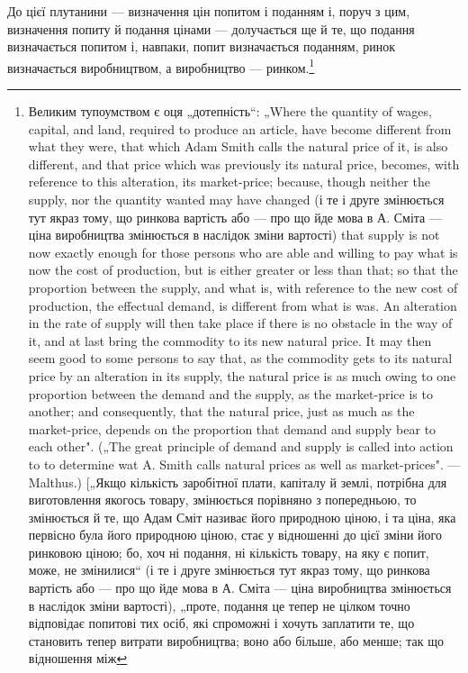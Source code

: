 До цієї плутанини — визначення цін попитом і поданням і,
поруч з цим, визначення попиту й подання цінами — долучається
ще й те, що подання визначається попитом і, навпаки,
попит визначається поданням, ринок визначається виробництвом,
а виробництво — ринком.\footnote{
Великим тупоумством є оця „дотепність“: „Where the quantity of wages,
capital, and land, required to produce an article, have become different from what
they were, that which Adam Smith calls the natural price of it, is also different,
and that price which was previously its natural price, becomes, with reference to
this alteration, its market-price; because, though neither the supply, nor the quantity
wanted may have changed (і те і друге змінюється тут якраз тому, що
ринкова вартість або — про що йде мова в А. Сміта — ціна виробництва змінюється
в наслідок зміни вартості) that supply is not now exactly enough for
those persons who are able and willing to pay what is now the cost of production,
but is either greater or less than that; so that the proportion between the supply,
and what is, with reference to the new cost of production, the effectual demand,
is different from what is was. An alteration in the rate of supply will then take
place if there is no obstacle іn the way of it, and at last bring the commodity
to its new natural price. It may then seem good to some persons to say that, as
the commodity gets to its natural price by an alteration in its supply, the natural
price is as much owing to one proportion between the demand and the supply, as
the market-price is to another; and consequently, that the natural price, just as
much as the market-price, depends on the proportion that demand and supply
bear to each other". („The great principle of demand and supply is called into
action to to determine wat A. Smith calls natural prices as well as market-prices". —
Malthus.) [„Якщо кількість заробітної плати, капіталу й землі, потрібна для
виготовлення якогось товару, змінюється порівняно з попередньою, то змінюється
й те, що Адам Сміт називає його природною ціною, і та ціна, яка
первісно була його природною ціною, стає у відношенні до цієї зміни його
ринковою ціною; бо, хоч ні подання, ні кількість товару, на яку є попит,
може, не змінилися“ (і те і друге змінюється тут якраз тому, що ринкова
вартість або — про що йде мова в А. Сміта — ціна виробництва змінюється
в наслідок зміни вартості), „проте, подання це тепер не цілком точно відповідає
попитові тих осіб, які спроможні і хочуть заплатити те, що становить тепер
витрати виробництва; воно або більше, або менше; так що відношення між
}
